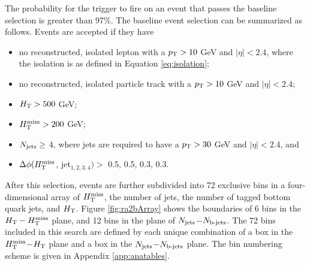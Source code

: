 The probability for the trigger to fire on an event that passes the baseline selection is greater than 97\%. The baseline event selection can be summarized as follows. Events are accepted if they have
\begin{itemize}
\item no reconstructed, isolated lepton with a $p_{\text{T}}>10$ GeV and $|\eta|<2.4$, where the isolation is as defined in Equation \ref{eq:isolation};
\item no reconstructed, isolated particle track with a $p_{\text{T}}>10$ GeV and $|\eta|<2.4$;
\item $H_{\rm T}>500$ GeV;
\item $H_{\text{T}}^{\rm miss}>200$ GeV;
\item $N_{\rm jets}\geq$ 4, where jets are required to have a $p_{\text{T}}>30$ GeV and $|\eta|<2.4$, and
\item $\Delta\phi(H_{\text{T}}^{\rm miss}$, jet$_{1,2,3,4})>$ 0.5, 0.5, 0.3, 0.3.
\end{itemize}
After this selection, events are further subdivided into 72 exclusive bins
in a four-dimensional array of $H_{\text{T}}^{\rm miss}$,
the number of jets,
the number of tagged bottom quark jets,
and $H_{\rm T}$. Figure \ref{fig:ra2bArray} shows the boundaries of 6 bins in the $H_{\rm T}-H_{\text{T}}^{\rm miss}$ plane, and 12 bins in the plane of $N_{\rm jets}$$-$$N_{\text{b-jets}}$. The 72 bins included in this search are defined by each unique combination of a box in the $H_{\text{T}}^{\rm miss}$$-$$H_{\rm T}$ plane and a box in the $N_{\rm jets}$$-$$N_{\text{b-jets}}$ plane. The bin numbering scheme is given in Appendix \ref{app:anatables}.
